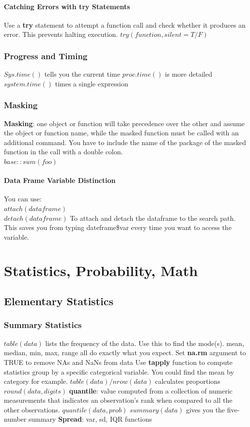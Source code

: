 \documentclass[openany]{book}
\begin{document}
\begin{flushleft}
\subsection{Catching Errors with try Statements}
Use a \textbf{try} statement to attempt a function call and check whether it produces an error. This prevents halting execution. \medbreak
$try(function,silent=T/F)$ \medbreak
\section{Progress and Timing}
$Sys.time()$ tells you the current time \medbreak
$proc.time()$ is more detailed \medbreak
$system.time()$ times a single expression
\section{Masking}
\textbf{Masking}: one object or function will take precedence over the other and assume the object or function name, while the masked function must be called with an additional command. \medbreak
You have to include the name of the package of the masked function in the call with a double colon.\\
$base::sum(foo)$
\subsection{Data Frame Variable Distinction}
You can use:\\
$attach(dataframe)$\\
$detach(dataframe)$ \medbreak
To attach and detach the dataframe to the search path. This saves you from typing dateframe\$var
every time you want to access the variable.
\part{Statistics, Probability, Math}
\chapter{Elementary Statistics}
\section{Summary Statistics}
$table(data)$ lists the frequency of the data. Use this to find the mode(s). \medbreak
mean, median, min, max, range all do exactly what you expect. \medbreak
Set \textbf{na.rm} argument to TRUE to remove NAs and NaNs from data \medbreak
Use \textbf{tapply} function to compute statistics group by a specific categorical variable. You could find the mean by category for example. \medbreak
$table(data)/nrow(data)$ calculates proportions \medbreak
$round(data,digits)$ \medbreak
\textbf{quantile}: value computed from a collection of numeric measurements that indicates an observation's rank when compared to all the other observations. \medbreak
$quantile(data,prob)$ \medbreak
$summary(data)$ gives you the five-number summary \medbreak
\textbf{Spread}: var, sd, IQR functions

\end{flushleft}
\end{document}
